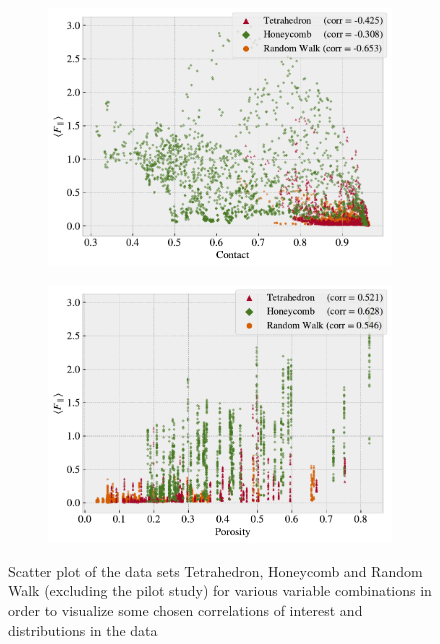 \begin{figure}[H]
\begin{subfigure}[t]{0.49\textwidth}
      \includegraphics[width=\textwidth]{figures/ML/corr_contact_Ff.pdf}
      \caption{}
  \end{subfigure}
  \hfill
  \begin{subfigure}[t]{0.49\textwidth}
      \centering
      \includegraphics[width=\textwidth]{figures/ML/corr_porosity_Ff.pdf}
      \caption{}
  \end{subfigure}
  \hfill
     \caption{Scatter plot of the data sets Tetrahedron, Honeycomb and Random Walk (excluding the pilot study) for various variable combinations in order to visualize some chosen  correlations of interest and distributions in the data}
     \label{fig:corr_vis}
\end{figure}



